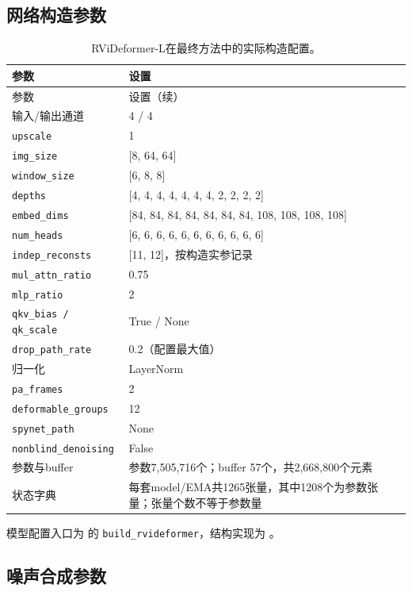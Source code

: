 \subsection{网络构造参数}

\begin{longtable}{p{}p{}}
\caption{RViDeformer-L在最终方法中的实际构造配置。}\label{tab:model_config}\\
\toprule 参数 & 设置 \\ \midrule
\endfirsthead
\toprule 参数 & 设置（续） \\ \midrule
\endhead
\bottomrule\endfoot
输入/输出通道 & 4 / 4 \\
\texttt{upscale} & 1 \\
\texttt{img\_size} & [8, 64, 64] \\
\texttt{window\_size} & [6, 8, 8] \\
\texttt{depths} & [4, 4, 4, 4, 4, 4, 4, 2, 2, 2, 2] \\
\texttt{embed\_dims} & [84, 84, 84, 84, 84, 84, 84, 108, 108, 108, 108] \\
\texttt{num\_heads} & [6, 6, 6, 6, 6, 6, 6, 6, 6, 6, 6] \\
\texttt{indep\_reconsts} & [11, 12]，按构造实参记录 \\
\texttt{mul\_attn\_ratio} & 0.75 \\
\texttt{mlp\_ratio} & 2 \\
\texttt{qkv\_bias / qk\_scale} & True / None \\
\texttt{drop\_path\_rate} & 0.2（配置最大值） \\
归一化 & LayerNorm \\
\texttt{pa\_frames} & 2 \\
\texttt{deformable\_groups} & 12 \\
\texttt{spynet\_path} & None \\
\texttt{nonblind\_denoising} & False \\
参数与buffer & 参数7,505,716个；buffer 57个，共2,668,800个元素 \\
状态字典 & 每套model/EMA共1265张量，其中1208个为参数张量；张量个数不等于参数量 \\
\end{longtable}

模型配置入口为  的 \texttt{build\_rvideformer}，结构实现为 。

\subsection{噪声合成参数}

